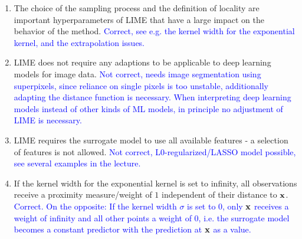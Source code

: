 {\begin{enumerate}
\begin{enumerate}
{                This is different to Shapley values or SHAP values, which must add up to the prediction at the single data point of interest.}
                \item
                The choice of the sampling process and the definition of locality are important hyperparameters of LIME that have a large impact on the behavior of the method. \textcolor{blue}{Correct, see e.g. the kernel width for the exponential kernel, and the extrapolation issues.}
                \item
                LIME does not require any adaptions to be applicable to deep learning models for image data.
                \textcolor{blue}{Not correct, needs image segmentation using superpixels, since reliance on single pixels is too unstable, additionally adapting the distance function is necessary.
                When interpreting deep learning models instead of other kinds of ML models, in principle no adjustment of LIME is necessary.} 
                \item
                LIME requires the surrogate model to use all available features - a selection of features is not allowed.
                \textcolor{blue}{Not correct, L0-regularized/LASSO model possible, see several examples in the lecture.}
                \item
                If the kernel width for the exponential kernel is set to infinity, all observations receive a proximity measure/weight of $1$ independent of their distance to $\mathbf{x}$.
                \textcolor{blue}{Correct. On the opposite: If the kernel width $\sigma$ is set to 0, only $\mathbf{x}$ receives a weight of infinity and all other points a weight of 0, i.e. the surrogate model becomes a constant predictor with the prediction at $\mathbf{x}$ as a value.}
          \end{enumerate}
  
\end{enumerate}
}
